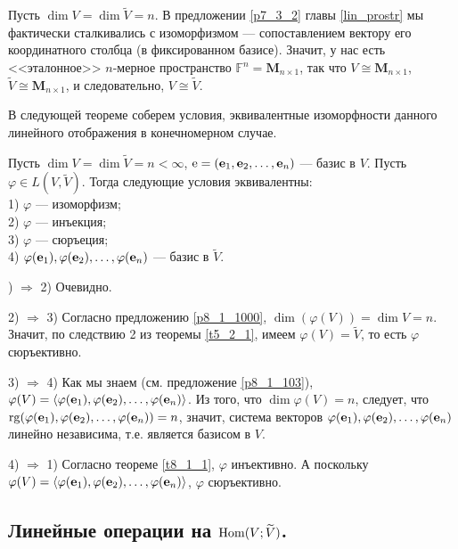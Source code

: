 \dokleft Пусть $\dim V = \dim \widetilde{V} =  n$.
В предложении \ref{p7_3_2} главы \ref{lin_prostr} мы фактически сталкивались с изоморфизмом
 --- сопоставлением вектору его координатного столбца (в фиксированном базисе). Значит, у нас есть
<<эталонное>> $n$-мерное пространство $\mathbb{F}^n = \mathbf{M}_{n\times 1}$, так что 
$V\cong \mathbf{M}_{n\times 1}$, $\widetilde{V} \cong \mathbf{M}_{n\times 1}$, и следовательно,
$V\cong \widetilde{V}$.
\edok

\otstup

В следующей теореме соберем условия, эквивалентные изоморфности данного линейного отображения
в конечномерном случае.

\begin{theor}\label{t_isom1}
Пусть $\dim V = \dim  \widetilde{V}=n <\infty $, $\mathrm{e} = (\mathbf{e}_1, \mathbf{e}_2, \ldots, \mathbf{e}_n )$ --- базис в $V$.
Пусть $\varphi \in L(V, \widetilde{V})$. Тогда следующие условия эквивалентны:\\
1) $\varphi$ --- изоморфизм;\\
2) $\varphi$ --- инъекция;\\
3) $\varphi$ --- сюръеция;\\
4)  $\varphi (\mathbf{e}_1), \varphi (\mathbf{e}_2), \ldots, \varphi ( \mathbf{e}_n )$ --- базис в $\widetilde{V}$.
\end{theor}
) $\Rightarrow$ 2) Очевидно.

2) $\Rightarrow$ 3) Согласно предложению \ref{p8_1_1000}, $\dim (\varphi (V)) = \dim V = n$. Значит, по следствию 2 из теоремы
\ref{t5_2_1}, имеем $\varphi (V)=\widetilde{V}$, то есть $\varphi$ сюръективно.

3) $\Rightarrow$ 4) Как мы знаем (см. предложение \ref{p8_1_103}), $\varphi (V) = \langle \varphi (\mathbf{e}_1), \varphi (\mathbf{e}_2), \ldots, \varphi ( \mathbf{e}_n ) \rangle$.
Из того, что $\dim \varphi (V) =n$, следует, что $\mathop{\rm rg}\nolimits (\varphi (\mathbf{e}_1), \varphi (\mathbf{e}_2), \ldots, \varphi ( \mathbf{e}_n ) )  =n$,
значит, система векторов $\varphi (\mathbf{e}_1), \varphi (\mathbf{e}_2), \ldots, \varphi ( \mathbf{e}_n )$ линейно независима, т.е. является базисом в $V$.

4) $\Rightarrow$ 1)  Согласно теореме \ref{t8_1_1}, $\varphi$ инъективно.
А поскольку $\varphi (V) = \langle \varphi (\mathbf{e}_1), \varphi (\mathbf{e}_2), \ldots, \varphi ( \mathbf{e}_n ) \rangle$, 
$\varphi$ сюръективно.
\edok




\subsection{Линейные операции на $\mathop{\rm Hom}\nolimits(V; \widetilde{V})$.}

